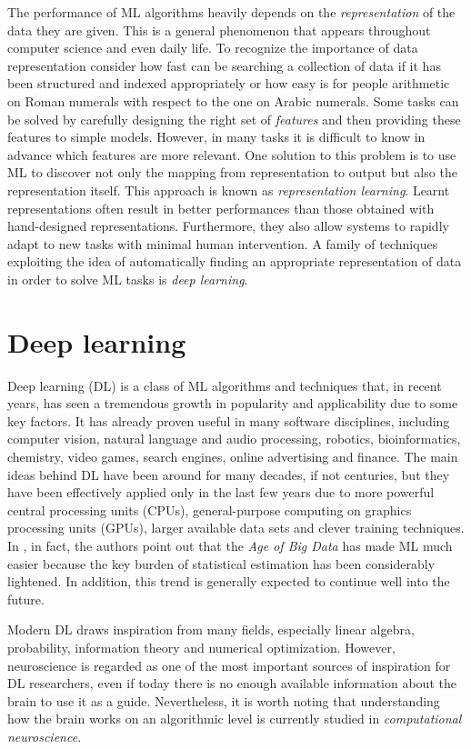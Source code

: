 The performance of ML algorithms heavily depends on the \textit{representation} of the data they are given. This is a general phenomenon that appears throughout computer science and even daily life. To recognize the importance of data representation consider how fast can be searching a collection of data if it has been structured and indexed appropriately or how easy is for people arithmetic on Roman numerals with respect to the one on Arabic numerals. Some tasks can be solved by carefully designing the right set of \textit{features} and then providing these features to simple models. However, in many tasks it is difficult to know in advance which features are more relevant. One solution to this problem is to use ML to discover not only the mapping from representation to output but also the representation itself. This approach is known as \textit{representation learning}. Learnt representations often result in better performances than those obtained with hand-designed representations. Furthermore, they also allow systems to rapidly adapt to new tasks with minimal human intervention. A family of techniques exploiting the idea of automatically finding an appropriate representation of data in order to solve ML tasks is \textit{deep learning}.


\section{Deep learning}

Deep learning (DL) is a class of ML algorithms and techniques that, in recent years, has seen a tremendous growth in popularity and applicability due to some key factors. It has already proven useful in many software disciplines, including computer vision, natural language and audio processing, robotics, bioinformatics, chemistry, video games, search engines, online advertising and finance. The main ideas behind DL have been around for many decades, if not centuries, but they have been effectively applied only in the last few years due to more powerful central processing units (CPUs), general-purpose computing on graphics processing units (GPUs), larger available data sets and clever training techniques. In \cite{The_DL_book}, in fact, the authors point out that the \textit{Age of Big Data} has made ML much easier because the key burden of statistical estimation has been considerably lightened. In addition, this trend is generally expected to continue well into the future.

Modern DL draws inspiration from many fields, especially linear algebra, probability, information theory and numerical optimization. However, neuroscience is regarded as one of the most important sources of inspiration for DL researchers, even if today there is no enough available information about the brain
to use it as a guide. Nevertheless, it is worth noting that understanding how the brain works on an algorithmic level is currently studied in \textit{computational neuroscience}.

